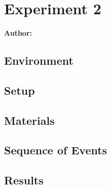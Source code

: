 \chapter{Experiment 2}

\textbf{Author: } 

\section{Environment}

\section{Setup}

\section{Materials}

\section{Sequence of Events}

\section{Results}

\filbreak